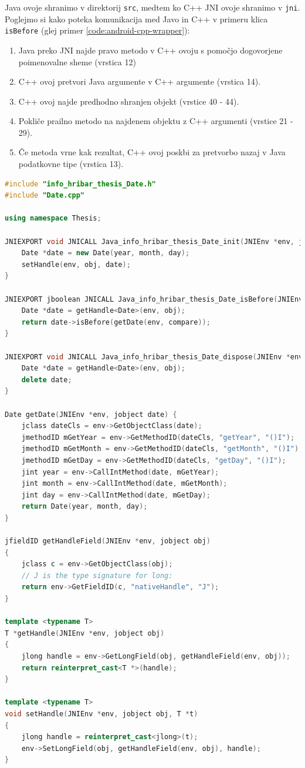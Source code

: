 Java ovoje shranimo v direktorij \texttt{src}, medtem ko C++ JNI ovoje shranimo v \texttt{jni}. Poglejmo si kako poteka komunikacija med Javo in C++ v primeru klica \texttt{isBefore} (glej primer \ref{code:android-cpp-wrapper}):

\begin{enumerate}
  \item Java preko JNI najde pravo metodo v C++ ovoju s pomočjo dogovorjene poimenovalne sheme (vrstica 12)
  \item C++ ovoj pretvori Java argumente v C++ argumente (vrstica 14).
  \item C++ ovoj najde predhodno shranjen objekt (vrstice 40 - 44).
  \item Pokliče prailno metodo na najdenem objektu z C++ argumenti (vrstice 21 - 29).
  \item Če metoda vrne kak rezultat, C++ ovoj poskbi za pretvorbo nazaj v Java podatkovne tipe (vrstica 13).
\end{enumerate}

\begin{lstlisting}[caption={Primer mosta med jezikoma Java in C++ razreda \texttt{Date}.}, label=code:android-cpp-wrapper, language=C++]
#include "info_hribar_thesis_Date.h"
#include "Date.cpp"

using namespace Thesis;

JNIEXPORT void JNICALL Java_info_hribar_thesis_Date_init(JNIEnv *env, jobject obj, jint year, jint month, jint day) {
	Date *date = new Date(year, month, day);
	setHandle(env, obj, date);
}

JNIEXPORT jboolean JNICALL Java_info_hribar_thesis_Date_isBefore(JNIEnv *env, jobject obj, jobject compare) {
	Date *date = getHandle<Date>(env, obj);
	return date->isBefore(getDate(env, compare));
}

JNIEXPORT void JNICALL Java_info_hribar_thesis_Date_dispose(JNIEnv *env, jobject obj) {
	Date *date = getHandle<Date>(env, obj);
	delete date;
}

Date getDate(JNIEnv *env, jobject date) {
	jclass dateCls = env->GetObjectClass(date);
	jmethodID mGetYear = env->GetMethodID(dateCls, "getYear", "()I");
	jmethodID mGetMonth = env->GetMethodID(dateCls, "getMonth", "()I");
	jmethodID mGetDay = env->GetMethodID(dateCls, "getDay", "()I");
	jint year = env->CallIntMethod(date, mGetYear);
	jint month = env->CallIntMethod(date, mGetMonth);
	jint day = env->CallIntMethod(date, mGetDay);
	return Date(year, month, day);
}

jfieldID getHandleField(JNIEnv *env, jobject obj)
{
    jclass c = env->GetObjectClass(obj);
    // J is the type signature for long:
    return env->GetFieldID(c, "nativeHandle", "J");
}

template <typename T>
T *getHandle(JNIEnv *env, jobject obj)
{
    jlong handle = env->GetLongField(obj, getHandleField(env, obj));
    return reinterpret_cast<T *>(handle);
}

template <typename T>
void setHandle(JNIEnv *env, jobject obj, T *t)
{
    jlong handle = reinterpret_cast<jlong>(t);
    env->SetLongField(obj, getHandleField(env, obj), handle);
}
\end{lstlisting}

